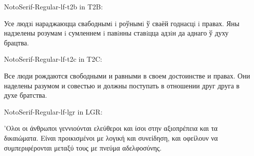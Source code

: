 {
NotoSerif-Regular-lf-t2b in T2B:
\TtwobNotoSrfR

Усе людзi нараджаюцца свабоднымi i роўнымi ў сваёй годнасцi i правах.
Яны надзелены розумам i сумленнем i павiнны ставiцца адзiн да аднаго ў духу брацтва.
}\vs

{
NotoSerif-Regular-lf-t2c in T2C:
\TtwocNotoSrfR

Все люди рождаются свободными и равными в своем достоинстве и правах.
Они наделены разумом и совестью и должны поступать в отношении друг друга в духе братства.
}\vs

{
NotoSerif-Regular-lf-lgr in LGR:
\LgrNotoSrfR

'Ολοι οι άνθρωποι γεννιούνται ελεύθεροι και ίσοι στην αξιοπρέπεια και τα δικαιώματα.
Είναι προικισμένοι με λογική και συνείδηση, και οφείλουν να συμπεριφέρονται μεταξύ τους με πνεύμα αδελφοσύνης.
}

\bye
